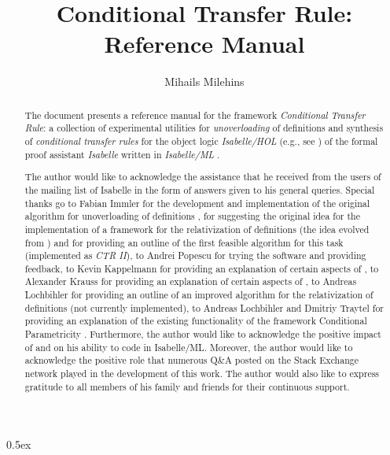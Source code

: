 \documentclass[11pt,a4paper]{article}
\begin{document}
\sloppy

\title{Conditional Transfer Rule: Reference Manual} 
\author{Mihails Milehins}
\maketitle

\newpage

\begin{abstract}
The document presents a reference manual for the framework 
\textit{Conditional Transfer Rule}: a collection of experimental utilities 
for \textit{unoverloading} 
\cite{kaufmann_mechanized_2010} 
of definitions and synthesis 
of \textit{conditional transfer rules} \cite{gonthier_lifting_2013}
for the object logic \textit{Isabelle/HOL} 
(e.g., see \cite{yang_comprehending_2017}) 
of the formal proof assistant \textit{Isabelle} \cite{paulson_natural_1986} 
written in \textit{Isabelle/ML} 
\cite{milner_definition_1997, wenzel_isabelle/isar_2019}. 
\end{abstract}

\newpage

\renewcommand{\abstractname}{Acknowledgements}
\begin{abstract}

The author would like to acknowledge the assistance that he received from 
the users of the mailing list of Isabelle 
\cite{noauthor_isabelle_nodate}
in the form of answers given to his general queries. 
Special thanks go to Fabian Immler for the development and implementation 
of the original algorithm for unoverloading of definitions 
\cite{immler_automation_2019}, for suggesting the original idea for 
the implementation of a framework for the relativization of definitions
(the idea evolved from \cite{immler_smooth_2019}) and for providing 
an outline of the first feasible algorithm for this task (implemented as 
\textit{CTR II}), 
to Andrei Popescu for trying the software and providing feedback, 
to Kevin Kappelmann for providing an explanation of certain aspects of 
\cite{kappelmann_speccheck_2021},
to Alexander Krauss for providing an explanation of certain aspects of 
\cite{kaufmann_mechanized_2010}, 
to Andreas Lochbihler for providing an outline 
of an improved algorithm for the relativization of definitions 
(not currently implemented), to Andreas Lochbihler and Dmitriy Traytel 
for providing an explanation of the existing functionality of the framework 
Conditional Parametricity \cite{gilcher_conditional_2017}.   
Furthermore, the author would like to acknowledge the positive 
impact of \cite{urban_isabelle_2019} and 
\cite{wenzel_isabelle/isar_2019} on his ability to code in Isabelle/ML.
Moreover, the author would like to acknowledge
the positive role that numerous Q\&A posted on the Stack Exchange network 
\cite{noauthor_stack_nodate} played in the development of this work. 
The author would also like to express gratitude to all members of his family 
and friends for their continuous support.

\end{abstract}

\newpage

\tableofcontents

\newpage

\parindent 0pt\parskip 0.5ex



\newpage


\end{document}
